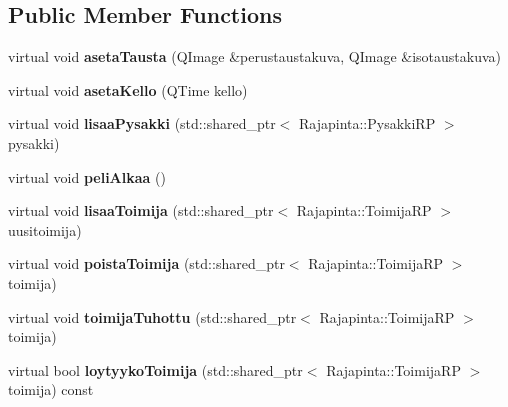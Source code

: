 \subsection*{Public Member Functions}
\begin{DoxyCompactItemize}
\item 
\hypertarget{class_kaupunki_a2a9066295e9dcbfaba97fb677c005bc7}{virtual void {\bfseries aseta\-Tausta} (Q\-Image \&perustaustakuva, Q\-Image \&isotaustakuva)}\label{class_kaupunki_a2a9066295e9dcbfaba97fb677c005bc7}

\item 
\hypertarget{class_kaupunki_a9a93cf4868b36877ac1e427bce009231}{virtual void {\bfseries aseta\-Kello} (Q\-Time kello)}\label{class_kaupunki_a9a93cf4868b36877ac1e427bce009231}

\item 
\hypertarget{class_kaupunki_a5587a426a73729ff72e77f6024e51cdb}{virtual void {\bfseries lisaa\-Pysakki} (std\-::shared\-\_\-ptr$<$ Rajapinta\-::\-Pysakki\-R\-P $>$ pysakki)}\label{class_kaupunki_a5587a426a73729ff72e77f6024e51cdb}

\item 
\hypertarget{class_kaupunki_a3c26d0aef4079b9702df58bbe0274b8a}{virtual void {\bfseries peli\-Alkaa} ()}\label{class_kaupunki_a3c26d0aef4079b9702df58bbe0274b8a}

\item 
\hypertarget{class_kaupunki_aefd6a15df4d2bd85206cc5262b25267c}{virtual void {\bfseries lisaa\-Toimija} (std\-::shared\-\_\-ptr$<$ Rajapinta\-::\-Toimija\-R\-P $>$ uusitoimija)}\label{class_kaupunki_aefd6a15df4d2bd85206cc5262b25267c}

\item 
\hypertarget{class_kaupunki_a5860256033079dda15f83c64b5e39a27}{virtual void {\bfseries poista\-Toimija} (std\-::shared\-\_\-ptr$<$ Rajapinta\-::\-Toimija\-R\-P $>$ toimija)}\label{class_kaupunki_a5860256033079dda15f83c64b5e39a27}

\item 
\hypertarget{class_kaupunki_aeb24cf16b8f512f0a6de6599e9d70d51}{virtual void {\bfseries toimija\-Tuhottu} (std\-::shared\-\_\-ptr$<$ Rajapinta\-::\-Toimija\-R\-P $>$ toimija)}\label{class_kaupunki_aeb24cf16b8f512f0a6de6599e9d70d51}

\item 
\hypertarget{class_kaupunki_ad889a1de8dfff75075c38e41a8bf0510}{virtual bool {\bfseries loytyyko\-Toimija} (std\-::shared\-\_\-ptr$<$ Rajapinta\-::\-Toimija\-R\-P $>$ toimija) const }\label{class_kaupunki_ad889a1de8dfff75075c38e41a8bf0510}


\end{DoxyCompactItemize}

